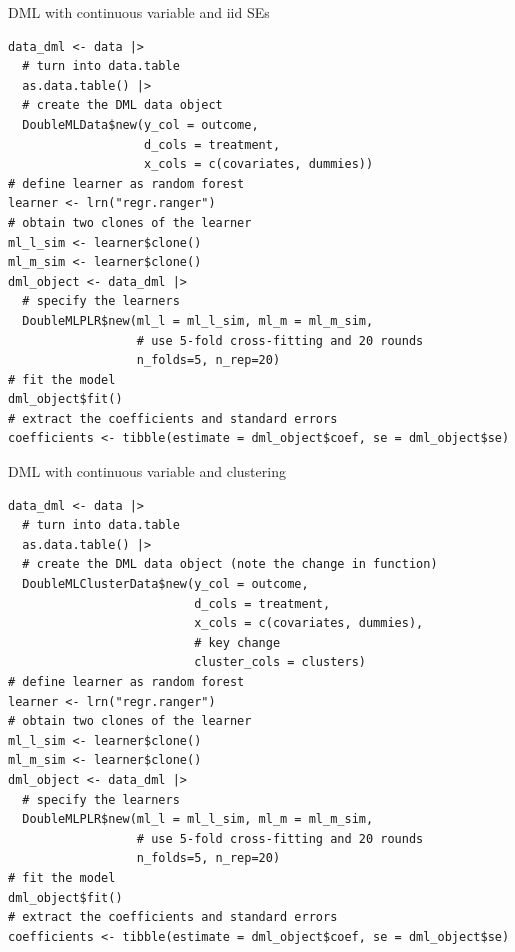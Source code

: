 \documentclass[10pt,table,aspectratio=169]{beamer}
\begin{document}
\begin{frame}[plain,fragile,label=two_dimensions]{DML with continuous variable and iid SEs}
\begin{verbatim}
data_dml <- data |>
  # turn into data.table
  as.data.table() |>
  # create the DML data object
  DoubleMLData$new(y_col = outcome,
                   d_cols = treatment,
                   x_cols = c(covariates, dummies))
# define learner as random forest
learner <- lrn("regr.ranger")
# obtain two clones of the learner
ml_l_sim <- learner$clone()
ml_m_sim <- learner$clone()
dml_object <- data_dml |>
  # specify the learners
  DoubleMLPLR$new(ml_l = ml_l_sim, ml_m = ml_m_sim,
                  # use 5-fold cross-fitting and 20 rounds
                  n_folds=5, n_rep=20)
# fit the model
dml_object$fit()
# extract the coefficients and standard errors
coefficients <- tibble(estimate = dml_object$coef, se = dml_object$se)
\end{verbatim}
\end{frame}

\begin{frame}[plain,fragile,label=two_dimensions]{DML with continuous variable and clustering}
\begin{verbatim}
data_dml <- data |>
  # turn into data.table
  as.data.table() |>
  # create the DML data object (note the change in function)
  DoubleMLClusterData$new(y_col = outcome,
                          d_cols = treatment,
                          x_cols = c(covariates, dummies),
                          # key change
                          cluster_cols = clusters)
# define learner as random forest
learner <- lrn("regr.ranger")
# obtain two clones of the learner
ml_l_sim <- learner$clone()
ml_m_sim <- learner$clone()
dml_object <- data_dml |>
  # specify the learners
  DoubleMLPLR$new(ml_l = ml_l_sim, ml_m = ml_m_sim,
                  # use 5-fold cross-fitting and 20 rounds
                  n_folds=5, n_rep=20)
# fit the model
dml_object$fit()
# extract the coefficients and standard errors
coefficients <- tibble(estimate = dml_object$coef, se = dml_object$se)
\end{verbatim}
\end{frame}
\end{document}
